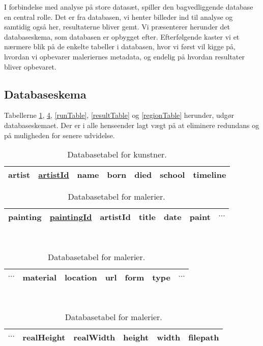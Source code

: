 {
{\sffamily I forbindelse med analyse på store datasæt, spiller den
bagvedliggende database en central rolle. Det er fra databasen, vi
henter billeder ind til analyse og samtidig også her, resultaterne
bliver gemt. Vi præsenterer herunder det databaseskema, som databasen er
opbygget efter.  Efterfølgende kaster vi et nærmere blik på de enkelte
tabeller i databasen, hvor vi først vil kigge på, hvordan vi opbevarer
maleriernes metadata, og endelig på hvordan resultater bliver opbevaret.
}

\subsection{Databaseskema}
Tabellerne \ref{artistTable}, \ref{paintingTable}, \ref{runTable},
\ref{resultTable} og \ref{regionTable} herunder, udgør databaseskemaet.
Der er i alle henseender lagt vægt på at eliminere redundans og på
muligheden for senere udvidelse.

\begin{table}[!h]
    \centering
    \begin{tabular}{|l||c|c|c|c|c|c|}
        \hline
        \bf{artist} \hspace{0.5cm} & \underline{artistId} & name & born & died & school & timeline \\\hline
    \end{tabular}
    \caption{Databasetabel for kunstner.}
    \label{artistTable}
\end{table}

\begin{table}[!h]
    \centering
    \begin{tabular}{|l||c|c|c|c|c|c}
        \hline
        \bf{painting} \hspace{0.5cm} & \underline{paintingId} & artistId & title & date & paint & $\cdots$ \\\hline
    \end{tabular}\\ \vspace{0.2cm}\hspace{1.2cm}
    \begin{tabular}{c|c|c|c|c|c|c}
        \hline
        $\cdots$ & material & location & url & form & type & $\cdots$ \\\hline
    \end{tabular}\\ \vspace{0.2cm}\hspace{1.4cm}
    \begin{tabular}{c|c|c|c|c|c|}
        \hline
        $\cdots$ & realHeight & realWidth & height & width & filepath \\\hline
    \end{tabular}
    \caption{Databasetabel for malerier.}
    \label{paintingTable}
\end{table}

}
